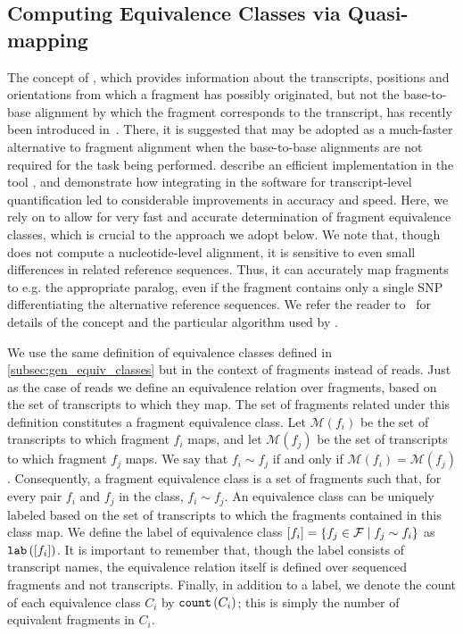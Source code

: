 \subsection{Computing Equivalence Classes via Quasi-mapping}
\label{subsec:quasimapping_equiv_classes}

The concept of \qm, which provides information about the transcripts, positions and orientations from which a fragment has possibly originated, but not the base-to-base alignment by which the fragment corresponds to the transcript, has recently been introduced in~\citet{rapmap}. There, it is suggested that \qm may be adopted as a much-faster alternative to fragment alignment when the base-to-base alignments are not required for the task being performed. \citeauthor{rapmap} describe an efficient implementation \qm in the tool \rapmap, and demonstrate how integrating \qm in the \sailfish software for transcript-level quantification led to considerable improvements in accuracy and speed. Here, we rely on \qm to allow for very fast and accurate determination of fragment equivalence classes, which is crucial to the approach we adopt below. We note that, though \qm does not compute a nucleotide-level alignment, it is sensitive to even small differences in related reference sequences.  Thus, it can accurately map fragments to e.g. the appropriate paralog, even if the fragment contains only a single SNP differentiating the alternative reference sequences.  We refer the reader to~\citep{rapmap} for details of the \qm concept and the particular algorithm used by \rapmap.

We use the same definition of equivalence classes defined in \ref{subsec:gen_equiv_classes} but in the context of fragments instead of reads.
Just as the case of reads we define an equivalence relation over fragments, based on the set of transcripts to which they map.  The set of fragments related under this definition constitutes a fragment equivalence class.  Let $\mathcal{M}\left(f_i\right)$ be the set of transcripts to which fragment $f_i$ maps, and let $\mathcal{M}\left(f_j\right)$ be the set of transcripts to which fragment $f_j$ maps.  We say that $f_i \sim f_j$ if and only if $\mathcal{M}\left(f_i\right) = \mathcal{M}\left(f_j\right)$. Consequently, a fragment equivalence class is a set of fragments such that, for every pair $f_i$ and $f_j$ in the class, $f_i \sim f_j$. An equivalence class can be uniquely labeled based on the set of transcripts to which the fragments contained in this class map.  We define the label of equivalence class $\left[f_i\right] = \{ f_j \in \mathcal{F} \mid f_j \sim f_i\}$ as $\text{\texttt{lab}}\left(\left[f_i\right]\right)$.  It is important to remember that, though the label consists of transcript names, the equivalence relation itself is defined over sequenced fragments and not transcripts.  Finally, in addition to a label, we denote the count of each equivalence class $C_i$ by $\text{\texttt{count}}\left(C_i\right)$; this is simply the number of equivalent fragments in $C_i$.


